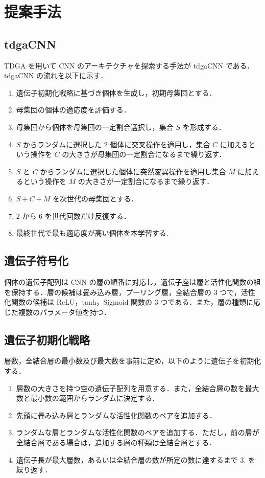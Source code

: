 \documentclass[twocolumn]{jarticle}     %
\begin{document}
\section{提案手法}

\subsection{tdgaCNN}
TDGA を用いて CNN のアーキテクチャを探索する手法が tdgaCNN である．tdgaCNN の流れを以下に示す．
\begin{enumerate}
    \item 遺伝子初期化戦略に基づき個体を生成し，初期母集団とする．
    \item 母集団の個体の適応度を評価する．
    \item 母集団から個体を母集団の一定割合選択し，集合 $S$ を形成する．
    \item $S$ からランダムに選択した 2 個体に交叉操作を適用し，集合 $C$ に加えるという操作を $C$ の大きさが母集団の一定割合になるまで繰り返す．
    \item $S$ と $C$ からランダムに選択した個体に突然変異操作を適用し集合 $M$ に加えるという操作を $M$ の大きさが一定割合になるまで繰り返す．
    \item $S + C + M$ を次世代の母集団とする．
    \item 2 から 6 を世代回数だけ反復する．
    \item 最終世代で最も適応度が高い個体を本学習する.
\end{enumerate}

\subsection{遺伝子符号化}
個体の遺伝子配列は CNN の層の順番に対応し，遺伝子座は層と活性化関数の組を保持する．層の候補は畳み込み層，プーリング層，全結合層の 3 つで，活性化関数の候補は ReLU，tanh，Sigmoid 関数の 3 つである．また，層の種類に応じた複数のパラメータ値を持つ．

\subsection{遺伝子初期化戦略}
層数，全結合層の最小数及び最大数を事前に定め，以下のように遺伝子を初期化する．
\begin{enumerate}
    \item 層数の大きさを持つ空の遺伝子配列を用意する．また，全結合層の数を最大数と最小数の範囲からランダムに決定する．
    \item 先頭に畳み込み層とランダムな活性化関数のペアを追加する．
    \item ランダムな層とランダムな活性化関数のペアを追加する．ただし，前の層が全結合層である場合は，追加する層の種類は全結合層とする．
    \item 遺伝子長が最大層数，あるいは全結合層の数が所定の数に達するまで 3. を繰り返す．
\end{enumerate}
\end{document}
